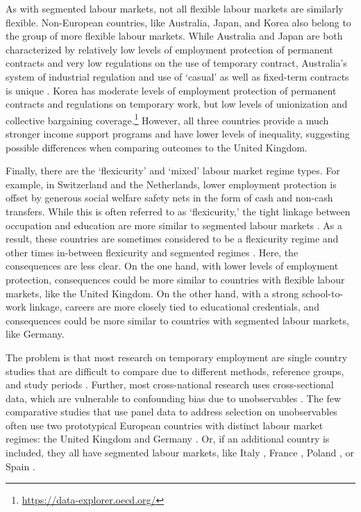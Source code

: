 \documentclass[12pt]{article}
\begin{document}
As with segmented labour markets, not all flexible labour markets are similarly flexible.  Non-European countries, like Australia, Japan, and Korea also belong to the group of more flexible labour markets.  While Australia and Japan are both characterized by relatively low levels of employment protection of permanent contracts and very low regulations on the use of temporary contract, Australia's system of industrial regulation and use of `casual' as well as fixed-term contracts is unique \citep{mooi-reci_casual_2017}.  Korea has moderate levels of employment protection of permanent contracts and regulations on temporary work, but low levels of unionization and collective bargaining coverage.\footnote{\url{https://data-explorer.oecd.org/}} However, all three countries provide a much stronger income support programs and have lower levels of inequality, suggesting possible differences when comparing outcomes to the United Kingdom.

Finally, there are the `flexicurity' and `mixed' labour market regime types.  For example, in Switzerland and the Netherlands, lower employment protection is offset by generous social welfare safety nets in the form of cash and non-cash transfers.  While this is often referred to as `flexicurity,' the tight linkage between occupation and education are more similar to segmented labour markets \citep{hevenstone_2011,helbling_fixed-term_2017,eberlein_etal_2023,janietz_etal_2023}.  As a result, these countries are sometimes considered to be a flexicurity regime and other times in-between flexicurity and segmented regimes \citep{barbieri_flexible_2009,muffels_labour_2008,gebel_is_2013}.  Here, the consequences are less clear.  On the one hand, with lower levels of employment protection, consequences could be more similar to countries with flexible labour markets, like the United Kingdom.  On the other hand, with a strong school-to-work linkage, careers are more closely tied to educational credentials, and consequences could be more similar to countries with segmented labour markets, like Germany.

The problem is that most research on temporary employment are single country studies that are difficult to compare due to different methods, reference groups, and study periods \citep{filomena_picchio_2022}.  Further, most cross-national research uses cross-sectional data, which are vulnerable to confounding bias due to unobservables \citep{arranz_wage_2021,westhoff_wage_2022,fauser_gebel_2023}.  The few comparative studies that use panel data to address selection on unobservables often use two prototypical European countries with distinct labour market regimes: the United Kingdom and Germany \citep{gebel_early_2010,giesecke_external_2004,pavlopoulos_starting_2013}.  Or, if an additional country is included, they all have segmented labour markets, like Italy \citep{scherer_stepping-stones_2004}, France \citep{gash_fixed-term_2007}, Poland \citep{kiersztyn_fixed-term_2016}, or Spain \citep{mertens_cost_2007}.  
\end{document}
